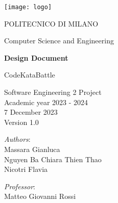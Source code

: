 \begin{titlingpage}
	\begin{center}
		\texttt{[image: logo]}
		
		\vspace{0.25cm}
		
		\LARGE POLITECNICO DI MILANO\\
		
		\vspace{0.2cm}
		
		\Large Computer Science and Engineering
		
		\vspace{0.8cm}
	
		\Huge \textbf{Design Document}
		
		\vspace{0.5cm}
		\huge CodeKataBattle
		
		\vspace{1.5cm}
		\LARGE Software Engineering 2 Project\\
		\Large Academic year 2023 - 2024\\
		\vspace{1cm}
		7 December 2023\\Version 1.0
		\vspace{2.5cm}
		
		\large
		\begin{minipage}{.1\textwidth}
			\null
		\end{minipage}%
		\begin{minipage}{.4\textwidth}
			\textit{Authors}:\\
			Massara Gianluca\\
			Nguyen Ba Chiara Thien Thao\\
			Nicotri Flavia
		\end{minipage}%
		\begin{minipage}{.4\textwidth}
			\raggedleft	
			\textit{Professor}:\\
			Matteo Giovanni Rossi\\
			\phantom{placeholder}
		\end{minipage}%
		\begin{minipage}{.1\textwidth}
			\null
		\end{minipage}
	
			
		\end{center}
\end{titlingpage}